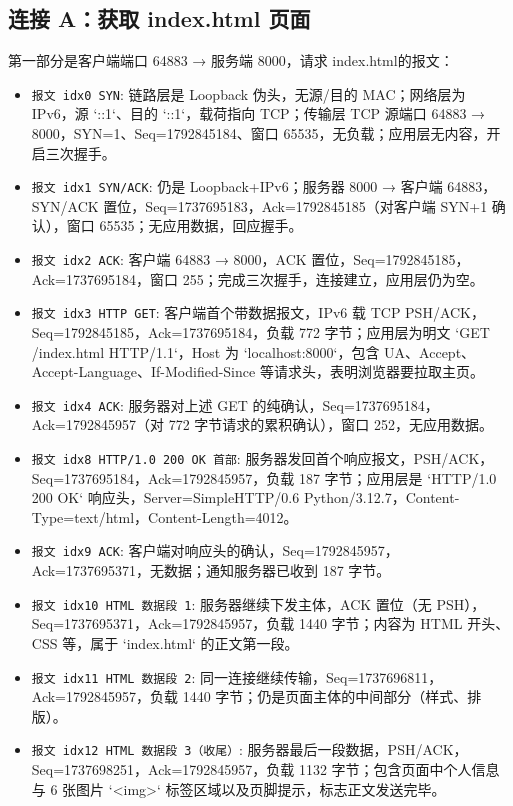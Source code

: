 \documentclass[a4paper]{article}
\begin{document}
	\subsection{连接 A：获取 index.html 页面}
	第一部分是客户端端口 64883 → 服务端 8000，请求 index.html的报文：
	\begin{itemize}
		\item \texttt{报文 idx0 SYN}: 链路层是 Loopback 伪头，无源/目的 MAC；网络层为 IPv6，源 `::1`、目的 `::1`，载荷指向 TCP；传输层 TCP 源端口 64883 → 8000，SYN=1、Seq=1792845184、窗口 65535，无负载；应用层无内容，开启三次握手。
		\item \texttt{报文 idx1 SYN/ACK}: 仍是 Loopback+IPv6；服务器 8000 → 客户端 64883，SYN/ACK 置位，Seq=1737695183，Ack=1792845185（对客户端 SYN+1 确认），窗口 65535；无应用数据，回应握手。
		\item \texttt{报文 idx2 ACK}: 客户端 64883 → 8000，ACK 置位，Seq=1792845185，Ack=1737695184，窗口 255；完成三次握手，连接建立，应用层仍为空。
		\item \texttt{报文 idx3 HTTP GET}: 客户端首个带数据报文，IPv6 载 TCP PSH/ACK，Seq=1792845185，Ack=1737695184，负载 772 字节；应用层为明文 `GET /index.html HTTP/1.1`，Host 为 `localhost:8000`，包含 UA、Accept、Accept-Language、If-Modified-Since 等请求头，表明浏览器要拉取主页。
		\item \texttt{报文 idx4 ACK}: 服务器对上述 GET 的纯确认，Seq=1737695184，Ack=1792845957（对 772 字节请求的累积确认），窗口 252，无应用数据。
		\item \texttt{报文 idx8 HTTP/1.0 200 OK 首部}: 服务器发回首个响应报文，PSH/ACK，Seq=1737695184，Ack=1792845957，负载 187 字节；应用层是 `HTTP/1.0 200 OK` 响应头，Server=SimpleHTTP/0.6 Python/3.12.7，Content-Type=text/html，Content-Length=4012。
		\item \texttt{报文 idx9 ACK}: 客户端对响应头的确认，Seq=1792845957，Ack=1737695371，无数据；通知服务器已收到 187 字节。
		\item \texttt{报文 idx10 HTML 数据段 1}: 服务器继续下发主体，ACK 置位（无 PSH），Seq=1737695371，Ack=1792845957，负载 1440 字节；内容为 HTML 开头、CSS 等，属于 `index.html` 的正文第一段。
		\item \texttt{报文 idx11 HTML 数据段 2}: 同一连接继续传输，Seq=1737696811，Ack=1792845957，负载 1440 字节；仍是页面主体的中间部分（样式、排版）。
		\item \texttt{报文 idx12 HTML 数据段 3（收尾）}: 服务器最后一段数据，PSH/ACK，Seq=1737698251，Ack=1792845957，负载 1132 字节；包含页面中个人信息与 6 张图片 `<img>` 标签区域以及页脚提示，标志正文发送完毕。

\end{itemize}
\end{document}
